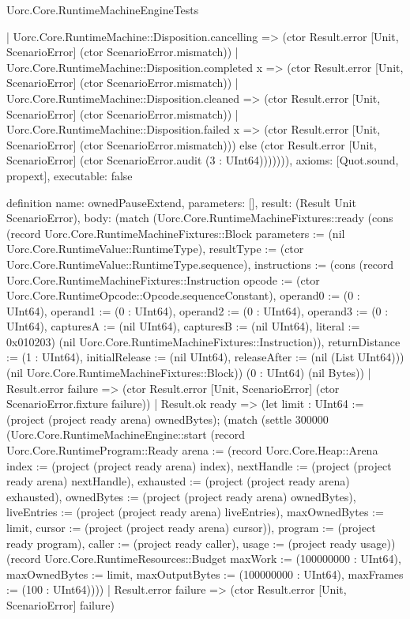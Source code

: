 \begin{lexlean}{Uorc.Core.RuntimeMachineEngineTests}
\begin{semanticmodule}
{        | Uorc.Core.RuntimeMachine::Disposition.cancelling => (ctor Result.error [Unit, ScenarioError] (ctor ScenarioError.mismatch))
        | Uorc.Core.RuntimeMachine::Disposition.completed x => (ctor Result.error [Unit, ScenarioError] (ctor ScenarioError.mismatch))
        | Uorc.Core.RuntimeMachine::Disposition.cleaned => (ctor Result.error [Unit, ScenarioError] (ctor ScenarioError.mismatch))
        | Uorc.Core.RuntimeMachine::Disposition.failed x => (ctor Result.error [Unit, ScenarioError] (ctor ScenarioError.mismatch))) else (ctor Result.error [Unit, ScenarioError] (ctor ScenarioError.audit (3 : UInt64))))))),
  axioms: [Quot.sound, propext],
  executable: false
}

definition{
  name: ownedPauseExtend,
  parameters: [],
  result: (Result Unit ScenarioError),
  body: (match (Uorc.Core.RuntimeMachineFixtures::ready (cons (record Uorc.Core.RuntimeMachineFixtures::Block {parameters := (nil Uorc.Core.RuntimeValue::RuntimeType), resultType := (ctor Uorc.Core.RuntimeValue::RuntimeType.sequence), instructions := (cons (record Uorc.Core.RuntimeMachineFixtures::Instruction {opcode := (ctor Uorc.Core.RuntimeOpcode::Opcode.sequenceConstant), operand0 := (0 : UInt64), operand1 := (0 : UInt64), operand2 := (0 : UInt64), operand3 := (0 : UInt64), capturesA := (nil UInt64), capturesB := (nil UInt64), literal := 0x010203}) (nil Uorc.Core.RuntimeMachineFixtures::Instruction)), returnDistance := (1 : UInt64), initialRelease := (nil UInt64), releaseAfter := (nil (List UInt64))}) (nil Uorc.Core.RuntimeMachineFixtures::Block)) (0 : UInt64) (nil Bytes))
    | Result.error failure => (ctor Result.error [Unit, ScenarioError] (ctor ScenarioError.fixture failure))
    | Result.ok ready => (let limit : UInt64 := (project (project ready arena) ownedBytes); (match (settle 300000 (Uorc.Core.RuntimeMachineEngine::start (record Uorc.Core.RuntimeProgram::Ready {arena := (record Uorc.Core.Heap::Arena {index := (project (project ready arena) index), nextHandle := (project (project ready arena) nextHandle), exhausted := (project (project ready arena) exhausted), ownedBytes := (project (project ready arena) ownedBytes), liveEntries := (project (project ready arena) liveEntries), maxOwnedBytes := limit, cursor := (project (project ready arena) cursor)}), program := (project ready program), caller := (project ready caller), usage := (project ready usage)}) (record Uorc.Core.RuntimeResources::Budget {maxWork := (100000000 : UInt64), maxOwnedBytes := limit, maxOutputBytes := (100000000 : UInt64), maxFrames := (100 : UInt64)})))
      | Result.error failure => (ctor Result.error [Unit, ScenarioError] failure)
}
\end{semanticmodule}
\end{lexlean}
